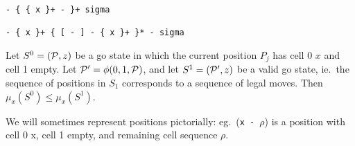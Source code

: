 \begin{verbatim}
- { { x }+ - }+ sigma

- { x }+ { [ - ] - { x }+ }* - sigma
\end{verbatim}

\begin{conjecture}
Let $S^0 =({\mathcal{P}},z)$ be a go state in which the current position
$P_j$ has cell 0 $x$ and cell 1 empty.
Let ${\mathcal{P}}' = \phi(0,1,{\mathcal{P}})$, and let
$S^1 = ({\mathcal{P}}',z)$ be a valid go state, ie.\ the sequence
of positions in $S_1$ corresponds to a sequence of legal moves.
Then $\mu_x(S^0) \leq \mu_x(S^1)$.
\end{conjecture}

We will sometimes represent positions pictorially:
eg.\ ({\tt x - }$\rho$) is a position with cell 0 x, cell 1 empty,
and remaining cell sequence $\rho$.

~

